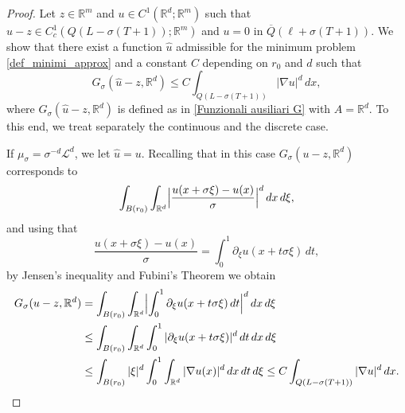\documentclass{article}
\theoremstyle{plain}
\theoremstyle{definition}
\def\rr{{\mathbb R}}
\def\ms{\mu_\sigma}
\newcommand{\s}{\sigma}
\numberwithin{equation}{section}
\begin{document}
\begin{proof}
Let $z \in \mathbb{R}^m$ and $u \in C^1(\mathbb{R}^d;\mathbb{R}^m)$ such that $u-z \in C^1_c(Q(L-\sigma( T+1));\mathbb{R}^m)$ and $u=0$ in $\overline{Q}(\ell+\sigma (T+1))$. We show that there exist a function $\hat{u}$ admissible for the minimum problem \eqref{def_minimi_approx} and a constant $C$ depending on $r_0$ and $d$ such that   \begin{equation}\label{claim sui bound}
        G_{\sigma}(\hat{u}-z,\mathbb{R}^d)\leq C\int_{Q(L-\s(T+1))}|\nabla u|^d\, dx,
    \end{equation}
    where $G_{\sigma}(\hat{u}-z,\mathbb{R}^d)$ is defined as in \eqref{Funzionali ausiliari G} with $A=\mathbb{R}^d$. To this end, we treat separately the continuous and the discrete case.
    
    If $\ms=\s^{-d}\mathcal{L}^d$, we let $\hat{u}=u$. Recalling that in this case $G_{\sigma}(u-z,\mathbb{R}^d)$ corresponds to
    \begin{equation*}
        \int_{B(r_0)}\int_{\rr^d}
\Bigl|\frac{u(x+\s\xi)-u(x)}{\s}\Bigr|^d\,dx \, d\xi,
    \end{equation*}
    and using that
    \begin{equation}\label{eq: identià integrale}
        \frac{u(x+\sigma \xi)-u(x)}{\sigma}=\int_{0}^{1}\partial_{\xi}u(x+t\sigma \xi )\, dt,
    \end{equation}
    by Jensen's inequality and Fubini's Theorem we obtain
    \begin{equation*}
        \begin{split}
            G_{\sigma}(u-z,\mathbb{R}^d)&=\int_{B(r_0)}\int_{\rr^d} \Bigl|\int_{0}^{1}\partial_{\xi}u(x+t\sigma \xi )\, dt \Bigr|^d \, dx\,d\xi\\
            &\leq \int_{B(r_0)}\int_{\rr^d} \int_0^1|\partial_{\xi}u(x+t\sigma  \xi)|^d\, dt\, dx\,d\xi\\
            &\leq\int_{B(r_0)}|\xi|^d\int_0^1\int_{\rr^d}|\nabla u(x)|^d\, dx\, dt\,d\xi
            \leq C \int_{Q(L-\s(T+1))}|\nabla u |^d\, dx.
        \end{split}
    \end{equation*}


\end{proof}
\end{document}
